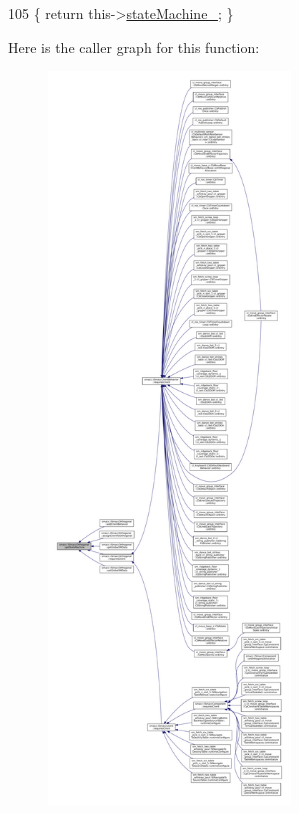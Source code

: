 \begin{DoxyCode}
105 \{ \textcolor{keywordflow}{return} this->\hyperlink{classsmacc_1_1ISmaccOrthogonal_a418b2e094a65013444ec1fca7e94f28d}{stateMachine\_}; \}
\end{DoxyCode}
Here is the caller graph for this function\+:
\nopagebreak
\begin{figure}[H]
\begin{center}
\leavevmode
\includegraphics[height=550pt]{classsmacc_1_1ISmaccOrthogonal_aae265ec480b8ed552ddc79afd2d93a62_icgraph}
\end{center}
\end{figure}
\mbox{\label{classsmacc_1_1ISmaccOrthogonal_a35f4d2955445dc1a4b2dafbca2f0bd16}} 

